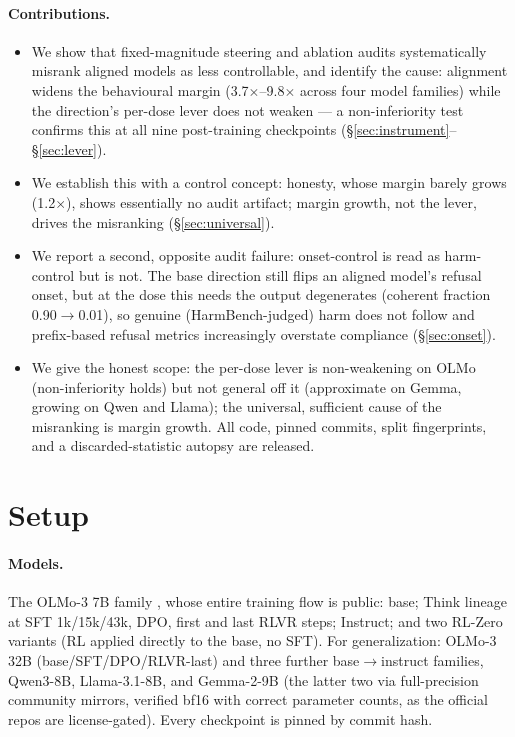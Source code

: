 \documentclass{article}
\newcommand{\x}{$\times$}
\begin{document}
\paragraph{Contributions.}
\begin{itemize}\itemsep2pt
\item We show that fixed-magnitude steering and ablation audits systematically misrank aligned
  models as less controllable, and identify the cause: alignment widens the behavioural margin
  (\num{3.7}\x--\num{9.8}\x{} across four model families) while the direction's per-dose lever does
  not weaken --- a non-inferiority test confirms this at all nine post-training checkpoints
  (\S\ref{sec:instrument}--\S\ref{sec:lever}).
\item We establish this with a control concept: honesty, whose margin barely grows
  (\num{1.2}\x), shows essentially no audit artifact; margin growth, not the lever, drives the
  misranking (\S\ref{sec:universal}).
\item We report a second, opposite audit failure: onset-control is read as harm-control but is not.
  The base direction still flips an aligned model's refusal onset, but at the dose this needs the
  output degenerates (coherent fraction \num{0.90}$\rightarrow$\num{0.01}), so genuine
  (HarmBench-judged) harm does not follow and prefix-based refusal metrics increasingly overstate
  compliance (\S\ref{sec:onset}).
\item We give the honest scope: the per-dose lever is non-weakening on OLMo (non-inferiority holds) but not general
  off it (approximate on Gemma, growing on Qwen and Llama); the universal, sufficient cause of the
  misranking is margin growth. All code, pinned commits, split fingerprints, and a
  discarded-statistic autopsy are released.
\end{itemize}

\section{Setup}\label{sec:setup}
\paragraph{Models.} The OLMo-3 7B family \citep{olmo3}, whose entire training flow is public: base;
Think lineage at SFT 1k/15k/43k, DPO, first and last RLVR steps; Instruct; and two RL-Zero variants
(RL applied directly to the base, no SFT). For generalization: OLMo-3 32B (base/SFT/DPO/RLVR-last)
and three further base$\rightarrow$instruct families, Qwen3-8B, Llama-3.1-8B, and Gemma-2-9B (the
latter two via full-precision community mirrors, verified bf16 with correct parameter counts, as
the official repos are license-gated). Every checkpoint is pinned by commit hash.
\end{document}
